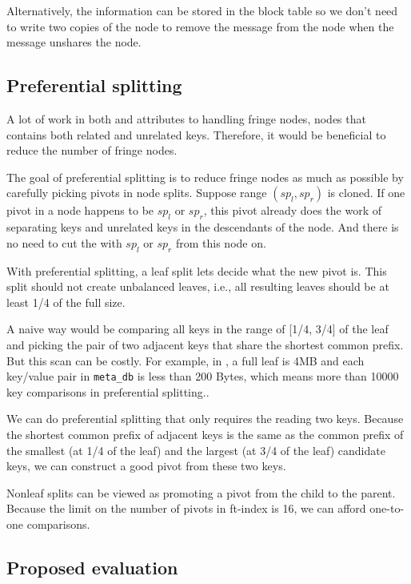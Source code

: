 Alternatively, the \rrefc information can be stored in the block table so
we don't need to write two copies of the node to remove the \rrefc message from
the node when the \spt message unshares the node.

\subsection{Preferential splitting}

A lot of work in both \rr and \spt attributes to handling fringe nodes, nodes
that contains both related and unrelated keys.
Therefore, it would be beneficial to reduce the number of fringe nodes.

The goal of preferential splitting is to reduce fringe nodes as much as
possible by carefully picking pivots in node splits.
Suppose range $(sp_l, sp_r)$ is cloned.
If one pivot in a node happens to be $sp_l$ or $sp_r$, this pivot already does
the work of separating keys and unrelated keys in the descendants of the node.
And there is no need to cut the \bet with $sp_l$ or $sp_r$ from this node on.

With preferential splitting, a leaf split lets \betrfs decide what the new
pivot is.
This split should not create unbalanced leaves, i.e., all resulting leaves
should be at least 1/4 of the full size.

A naive way would be comparing all keys in the range of [1/4, 3/4] of the leaf
and picking the pair of two adjacent keys that share the shortest common prefix.
But this scan can be costly.
For example, in \betrfs, a full leaf is 4MB and each key/value pair in
\texttt{meta\_db} is less than 200 Bytes, which means more than 10000 key
comparisons in preferential splitting..

We can do preferential splitting that only requires the reading two keys.
Because the shortest common prefix of adjacent keys is the same as the common
prefix of the smallest (at 1/4 of the leaf) and the largest (at 3/4 of the leaf)
candidate keys, we can construct a good pivot from these two keys.

Nonleaf splits can be viewed as promoting a pivot from the child to the parent.
Because the limit on the number of pivots in ft-index is 16, we can afford
one-to-one comparisons.

\subsection{Proposed evaluation}

